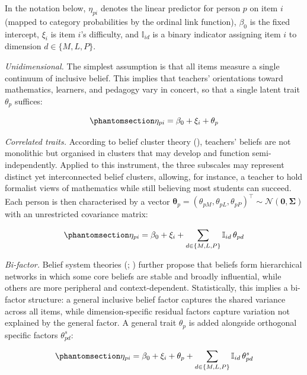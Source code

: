 \documentclass[
  man,
  floatsintext,
  longtable,
  nolmodern,
  notxfonts,
  notimes,
  colorlinks=true,linkcolor=blue,citecolor=blue,urlcolor=blue]{apa7}
\begin{document}
In the notation below, \(\eta_{pi}\) denotes the linear predictor for
person \(p\) on item \(i\) (mapped to category probabilities by the
ordinal link function), \(\beta_0\) is the fixed intercept, \(\xi_i\) is
item \(i\)'s difficulty, and \(\mathbb{I}_{id}\) is a binary indicator
assigning item \(i\) to dimension \(d \in \{M, L, P\}\).

\emph{Unidimensional.} The simplest assumption is that all items measure
a single continuum of inclusive belief. This implies that teachers'
orientations toward mathematics, learners, and pedagogy vary in concert,
so that a single latent trait \(\theta_p\) suffices:

\begin{equation}\phantomsection\label{eq-uni}{
\eta_{pi} = \beta_0 + \xi_i + \theta_p
}\end{equation}

\emph{Correlated traits.} According to belief cluster theory
(), teachers' beliefs are
not monolithic but organised in clusters that may develop and function
semi-independently. Applied to this instrument, the three subscales may
represent distinct yet interconnected belief clusters, allowing, for
instance, a teacher to hold formalist views of mathematics while still
believing most students can succeed. Each person is then characterised
by a vector
\(\boldsymbol{\theta}_p = (\theta_{pM}, \theta_{pL}, \theta_{pP})^\top
\sim \mathcal{N}(\mathbf{0}, \boldsymbol{\Sigma})\) with an unrestricted
covariance matrix:

\begin{equation}\phantomsection\label{eq-ct}{
\eta_{pi} = \beta_0 + \xi_i 
  + \sum_{d \in \{M,L,P\}} \mathbb{I}_{id}\, \theta_{pd}
}\end{equation}

\emph{Bi-factor.} Belief system theories
(;
) further propose that
beliefs form hierarchical networks in which some core beliefs are stable
and broadly influential, while others are more peripheral and
context-dependent. Statistically, this implies a bi-factor structure: a
general inclusive belief factor captures the shared variance across all
items, while dimension-specific residual factors capture variation not
explained by the general factor. A general trait \(\theta_p\) is added
alongside orthogonal specific factors \(\theta_{pd}^{s}\):

\begin{equation}\phantomsection\label{eq-bf}{
\eta_{pi} = \beta_0 + \xi_i + \theta_p 
  + \sum_{d \in \{M,L,P\}} \mathbb{I}_{id}\, \theta_{pd}^{s}
}\end{equation}
\end{document}
